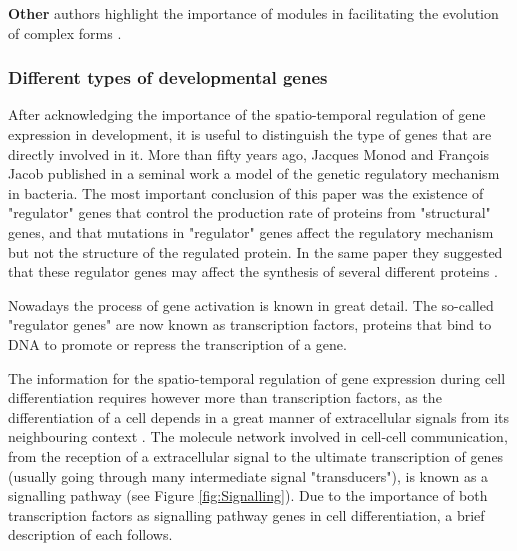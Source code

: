 \textbf{Other} authors highlight the importance of modules in facilitating the evolution of complex forms \citep{Carroll2001a}.


\subsubsection{Different types of developmental genes}

After acknowledging the importance of the spatio-temporal regulation of gene expression in development, it is useful to distinguish the type of genes that are directly involved in it.
More than fifty years ago, Jacques Monod and Fran\c cois Jacob \citep{JACOB1961} published in a seminal work a model of the genetic regulatory mechanism in bacteria.
The most important conclusion of this paper was the existence of "regulator" genes that control the production rate of proteins from "structural" genes, and that mutations in "regulator" genes affect the regulatory mechanism but not the structure of the regulated protein. In the same paper they suggested that these regulator genes may affect the synthesis of several different proteins \citep{JACOB1961}.

Nowadays the process of gene activation is known in great detail. The so-called "regulator genes" are now known as transcription factors, proteins that bind to DNA to promote or repress the transcription of a gene. 

The information for the spatio-temporal regulation of gene expression during cell differentiation requires however more than transcription factors, as the differentiation of a cell depends in a great manner of extracellular signals from its neighbouring context \citep{Gilbert2014}.
The molecule network involved in cell-cell communication, from the reception of a extracellular signal to the ultimate transcription of genes (usually going through many intermediate signal "transducers"), is known as a signalling pathway (see Figure \ref{fig:Signalling}).
Due to the importance of both transcription factors as signalling pathway genes in cell differentiation, a brief description of each follows.

